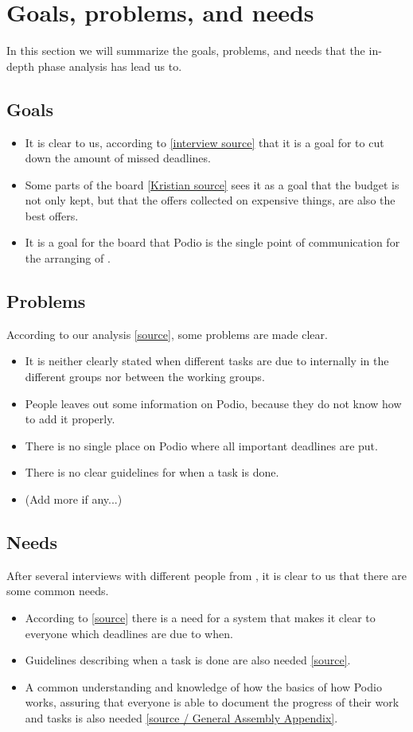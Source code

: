 \section{Goals, problems, and needs}
\label{sec:goprne}
In this section we will summarize the goals, problems, and needs that the
in-depth phase analysis has lead us to.

\subsection{Goals}
\label{subsec:goals}
\begin{itemize}
    \item It is clear to us, according to \ref{interview source} that it is a goal for \mil  to cut down
    the amount of missed deadlines.
    \item Some parts of the board \ref{Kristian source} sees it as a goal that the
    budget is not only kept, but that the offers collected on expensive things, are
    also the best offers.
    \item It is a goal for the board that Podio is the single point of communication
    for the arranging of \mil.
\end{itemize}

\subsection{Problems}
\label{subsec:problems}
According to our analysis \ref{source}, some problems are made clear.
\begin{itemize}
    \item It is neither clearly stated when different tasks are due to
    internally in the different groups nor between the working groups.
    \item People leaves out some information on Podio, because they do not know
    how to add it properly.
    \item There is no single place on Podio where all important deadlines are
    put.
    \item There is no clear guidelines for when a task is done.
    \item (Add more if any...)
\end{itemize}

\subsection{Needs}
\label{subsec:needs}
After several interviews with different people from \mil, it is clear to us that
there are some common needs.
\begin{itemize}
    \item According to \ref{source} there is a need for a system that makes it
    clear to everyone which deadlines are due to when.
    \item Guidelines describing when a task is done are also needed
    \ref{source}.
    \item A common understanding and knowledge of how the basics of how Podio
    works, assuring that everyone is able to document the progress of their work
    and tasks is also needed \ref{source / General Assembly Appendix}.
\end{itemize}

